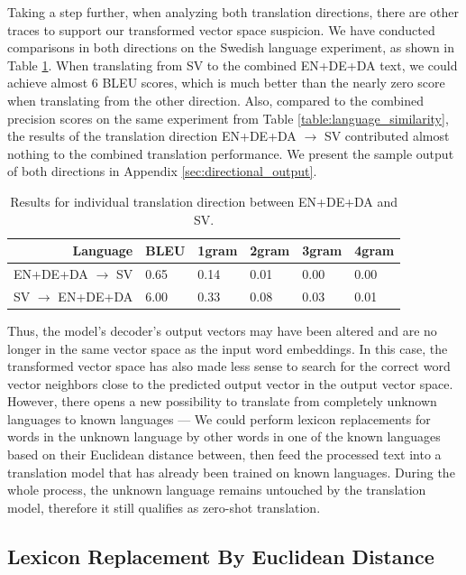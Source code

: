 \documentclass[thesis]{cluu}
\begin{document}
Taking a step further, when analyzing both translation directions, there are other traces to support our transformed vector space suspicion. We have conducted comparisons in both directions on the Swedish language experiment, as shown in Table \ref{table:directional_results}. When translating from SV to the combined EN+DE+DA text, we could achieve almost 6 BLEU scores, which is much better than the nearly zero score when translating from the other direction. Also, compared to the combined precision scores on the same experiment from Table \ref{table:language_similarity}, the results of the translation direction EN+DE+DA $\rightarrow$ SV contributed almost nothing to the combined translation performance. We present the sample output of both directions in Appendix \ref{sec:directional_output}.

\begin{table}
  \centering
  \begin{tabular}{r|*{5}{l}}
    \hline
    \textbf{Language} & \textbf{BLEU} & \textbf{1gram} & \textbf{2gram} & \textbf{3gram} & \textbf{4gram} \\ [0.25ex]
    \hline\hline
    EN+DE+DA $\rightarrow$ SV & 0.65 & 0.14 & 0.01 & 0.00 & 0.00 \\
    SV $\rightarrow$ EN+DE+DA & 6.00 & 0.33 & 0.08 & 0.03 & 0.01 \\
    \hline
  \end{tabular}
  \caption{Results for individual translation direction between EN+DE+DA and SV.}
  \label{table:directional_results}
\end{table}

Thus, the model's decoder's output vectors may have been altered and are no longer in the same vector space as the input word embeddings. In this case, the transformed vector space has also made less sense to search for the correct word vector neighbors close to the predicted output vector in the output vector space. However, there opens a new possibility to translate from completely unknown languages to known languages --- We could perform lexicon replacements for words in the unknown language by other words in one of the known languages based on their Euclidean distance between, then feed the processed text into a translation model that has already been trained on known languages. During the whole process, the unknown language remains untouched by the translation model, therefore it still qualifies as zero-shot translation.

\subsection{Lexicon Replacement By Euclidean Distance}
\end{document}
